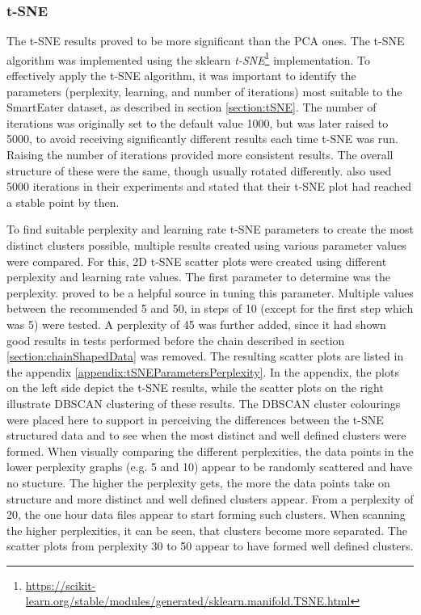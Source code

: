 \subsubsection{t-SNE}
\label{section:experimentTSNE}
The t-SNE results proved to be more significant than the PCA ones. The t-SNE algorithm was implemented using the sklearn \textit{t-SNE}\footnote{\url{https://scikit-learn.org/stable/modules/generated/sklearn.manifold.TSNE.html}} implementation.
To effectively apply the t-SNE algorithm, it was important to identify the parameters (perplexity, learning, and number of iterations) most suitable to the SmartEater dataset, as described in section \ref{section:tSNE}. The number of iterations was originally set to the default value 1000, but was later raised to 5000, to avoid receiving significantly different results each time t-SNE was run. Raising the number of iterations provided more consistent results. The overall structure of these were the same, though usually rotated differently. \textcite{wattenberg2016how} also used 5000 iterations in their experiments and stated that their t-SNE plot had reached a stable point by then.

To find suitable perplexity and learning rate t-SNE parameters to create the most distinct clusters possible, multiple results created using various parameter values were compared. For this, 2D t-SNE scatter plots were created using different perplexity and learning rate values. 
The first parameter to determine was the perplexity. \textcite{wattenberg2016how} proved to be a helpful source in tuning this parameter. Multiple values between the recommended 5 and 50, in steps of 10 (except for the first step which was 5) were tested. A perplexity of 45 was further added, since it had shown good results in tests performed before the chain described in section \ref{section:chainShapedData} was removed. The resulting scatter plots are listed in the appendix \ref{appendix:tSNEParametersPerplexity}. In the appendix, the plots on the left side depict the t-SNE results, while the scatter plots on the right illustrate DBSCAN clustering of these results. The DBSCAN cluster colourings were placed here to support in perceiving the differences between the t-SNE structured data and to see when the most distinct and well defined clusters were formed. When visually comparing the different perplexities, the data points in the lower perplexity graphs (e.g. 5 and 10) appear to be randomly scattered and have no stucture. The higher the perplexity gets, the more the data points take on structure and more distinct and well defined clusters appear. From a perplexity of 20, the one hour data files appear to start forming such clusters. When scanning the higher perplexities, it can be seen, that clusters become more separated. The scatter plots from perplexity 30 to 50 appear to have formed well defined clusters. 

